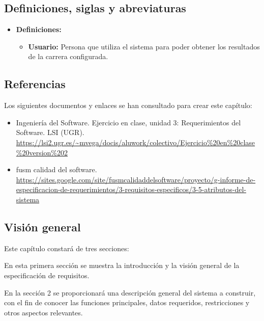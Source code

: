 \subsection{Definiciones, siglas y abreviaturas}

\begin{itemize}
    \item \textbf{Definiciones: }
        \begin{itemize}
            \item \textbf{Usuario: }Persona que utiliza el sistema para poder obtener los resultados de la carrera configurada.
        \end{itemize}
\end{itemize}

\subsection{Referencias}

Los siguientes documentos y enlaces se han consultado para crear este capítulo:

\begin{itemize}
    \item Ingeniería del Software. Ejercicio en clase, unidad 3: Requerimientos del Software. LSI (UGR). \url{https://lsi2.ugr.es/~mvega/docis/aluwork/colectivo/Ejercicio%20en%20clase%20version%202}
    \item fusm calidad del software. \url{https://sites.google.com/site/fusmcalidaddelsoftware/proyecto/g-informe-de-especificacion-de-requerimientos/3-requisitos-especificos/3-5-atributos-del-sistema}
\end{itemize}

\subsection{Visión general}
Este capítulo constará de tres secciones: %

\bigskip

En esta primera sección se muestra la introducción y la visión general de la especificación de requisitos.

\bigskip

En la sección 2 se proporcionará una descripción general del sistema a construir, con el fin de conocer las funciones principales, datos requeridos, restricciones y otros aspectos relevantes. 

\bigskip

